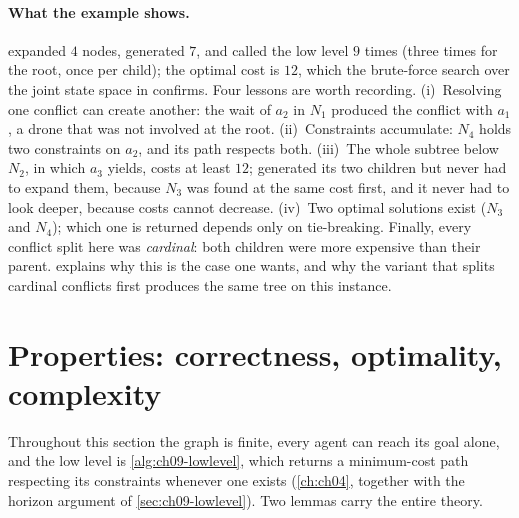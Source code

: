 \paragraph{What the example shows.} \cbs expanded $4$ nodes, generated
$7$, and called the low level $9$ times (three times for the root, once per
child); the optimal cost is $12$, which the brute-force search over the joint
state space in  confirms. Four lessons are worth
recording. (i)~Resolving one conflict can create another: the wait of $a_2$
in $N_1$ produced the conflict with $a_1$, a drone that was not involved at
the root. (ii)~Constraints accumulate: $N_4$ holds two constraints on $a_2$,
and its path respects both. (iii)~The whole subtree below $N_2$, in which
$a_3$ yields, costs at least $12$; \cbs generated its two children but never
had to expand them, because $N_3$ was found at the same cost first, and it
never had to look deeper, because costs cannot decrease. (iv)~Two optimal
solutions exist ($N_3$ and $N_4$); which one is returned depends only on
tie-breaking. Finally, every conflict split here was \emph{cardinal}: both
children were more expensive than their parent. 
explains why this is the case one wants, and why the variant that splits
cardinal conflicts first produces the same tree on this instance.

\section{Properties: correctness, optimality, complexity}
\label{sec:ch09-properties}

Throughout this section the graph is finite, every agent can reach its
goal alone, and the low level is \cref{alg:ch09-lowlevel}, which returns a
minimum-cost path respecting its constraints whenever one exists
(\cref{ch:ch04}, together with the horizon argument of
\cref{sec:ch09-lowlevel}). Two lemmas carry the entire theory.

